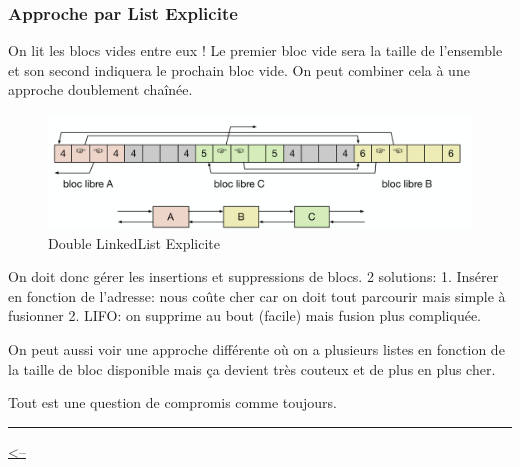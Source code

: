 \subsubsection{Approche par List
Explicite}\label{approche-par-list-explicite}

On lit les blocs vides entre eux ! Le premier bloc vide sera la taille
de l'ensemble et son second indiquera le prochain bloc vide. On peut
combiner cela à une approche doublement chaînée.

\begin{figure}
\centering
\includegraphics{image-51.png}
\caption{Double LinkedList Explicite}
\end{figure}

On doit donc gérer les insertions et suppressions de blocs. 2 solutions:
1. Insérer en fonction de l'adresse: nous coûte cher car on doit tout
parcourir mais simple à fusionner 2. LIFO: on supprime au bout (facile)
mais fusion plus compliquée.

On peut aussi voir une approche différente où on a plusieurs listes en
fonction de la taille de bloc disponible mais ça devient très couteux et
de plus en plus cher.

Tout est une question de compromis comme toujours.

\begin{center}\rule{0.5\linewidth}{0.5pt}\end{center}

\href{../README.md}{\textless--}
